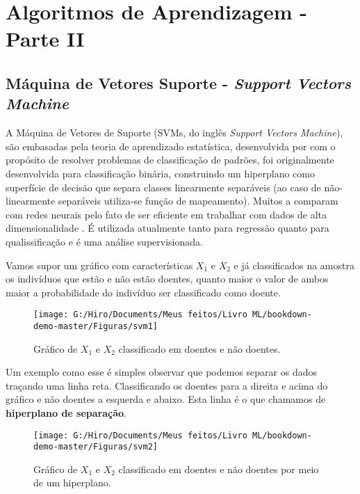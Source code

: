 \documentclass[
]{book}
\begin{document}
\hypertarget{ptII}{%
\chapter{Algoritmos de Aprendizagem - Parte II}\label{ptII}}

\hypertarget{svm}{%
\section{\texorpdfstring{Máquina de Vetores Suporte - \emph{Support Vectors Machine}}{Máquina de Vetores Suporte - Support Vectors Machine}}\label{svm}}

A Máquina de Vetores de Suporte (SVMs, do inglês \emph{Support Vectors Machine}), são embasadas pela teoria de aprendizado estatística, desenvolvida por \citet{vapnik2013nature} com o propósito de resolver problemas de classificação de padrões, foi originalmente desenvolvida para classificação binária, construindo um hiperplano como superfície de decisão que separa classes linearmente separáveis (ao caso de não-linearmente separáveis utiliza-se função de mapeamento). Muitos a comparam com redes neurais pelo fato de ser eficiente em trabalhar com dados de alta dimensionalidade \citep{sung2003identifying, ding2001multi}. É utilizada atualmente tanto para regressão quanto para qualissificação e é uma análise supervisionada.

Vamos supor um gráfico com características \(X_1\) e \(X_2\) e já classificados na amostra os indivíduos que estão e não estão doentes, quanto maior o valor de ambos maior a probabilidade do indivíduo ser classificado como doente.

\begin{figure}

{\centering \texttt{[image: G:/Hiro/Documents/Meus feitos/Livro ML/bookdown-demo-master/Figuras/svm1]} 

}

\caption{Gráfico de \(X_1\) e \(X_2\) classificado em doentes e não doentes.}\label{fig:svm1}
\end{figure}



Um exemplo como esse é simples observar que podemos separar os dados traçando uma linha reta. Classificando os doentes para a direita e acima do gráfico e não doentes a esquerda e abaixo. Esta linha é o que chamamos de \textbf{hiperplano de separação}.

\begin{figure}

{\centering \texttt{[image: G:/Hiro/Documents/Meus feitos/Livro ML/bookdown-demo-master/Figuras/svm2]} 

}

\caption{Gráfico de \(X_1\) e \(X_2\) classificado em doentes e não doentes por meio de um hiperplano.}\label{fig:svm2}
\end{figure}
\end{document}
